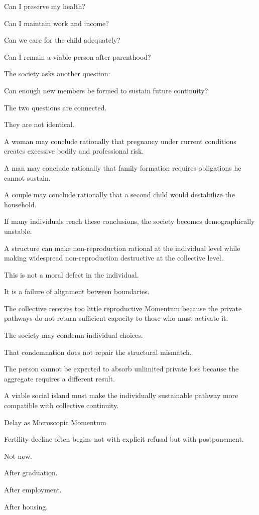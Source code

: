 Can I preserve my health?

Can I maintain work and income?

Can we care for the child adequately?

Can I remain a viable person after parenthood?

The society asks another question:

Can enough new members be formed to sustain future continuity?

The two questions are connected.

They are not identical.

A woman may conclude rationally that pregnancy under current conditions creates excessive bodily and professional risk.

A man may conclude rationally that family formation requires obligations he cannot sustain.

A couple may conclude rationally that a second child would destabilize the household.

If many individuals reach these conclusions, the society becomes demographically unstable.

A structure can make non-reproduction rational at the individual level while making widespread non-reproduction destructive at the collective level.

This is not a moral defect in the individual.

It is a failure of alignment between boundaries.

The collective receives too little reproductive Momentum because the private pathways do not return sufficient capacity to those who must activate it.

The society may condemn individual choices.

That condemnation does not repair the structural mismatch.

The person cannot be expected to absorb unlimited private loss because the aggregate requires a different result.

A viable social island must make the individually sustainable pathway more compatible with collective continuity.

Delay as Microscopic Momentum

Fertility decline often begins not with explicit refusal but with postponement.

Not now.

After graduation.

After employment.

After housing.

